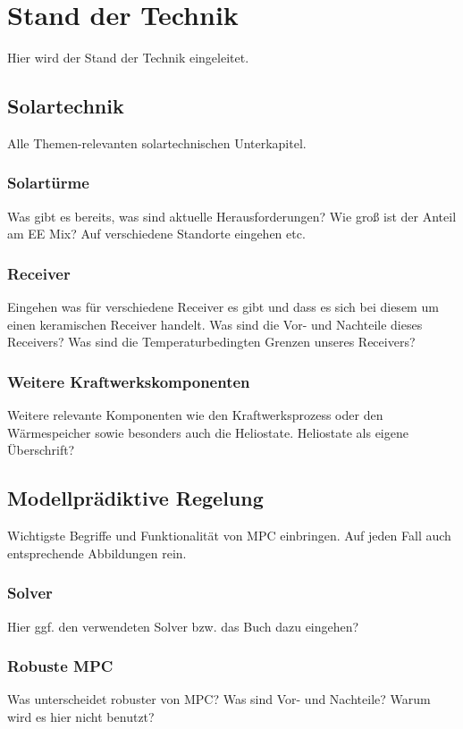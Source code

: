 \chapter{Stand der Technik} \label{ch_StandTechnik}
Hier wird der Stand der Technik eingeleitet.

\section{Solartechnik} \label{sec_Solartechnik}
Alle Themen-relevanten solartechnischen Unterkapitel.

\subsection{Solartürme} \label{subsec_Solartürme}
Was gibt es bereits, was sind aktuelle Herausforderungen?
Wie groß ist der Anteil am EE Mix?
Auf verschiedene Standorte eingehen etc.

\subsection{Receiver} \label{subsec_Receiver}
Eingehen was für verschiedene Receiver es gibt und dass es sich bei diesem um einen keramischen Receiver handelt.
Was sind die Vor- und Nachteile dieses Receivers?
Was sind die Temperaturbedingten Grenzen unseres Receivers?

\subsection{Weitere Kraftwerkskomponenten} \label{subsec_WeitereKomponenten}
Weitere relevante Komponenten wie den Kraftwerksprozess oder den Wärmespeicher sowie besonders auch die Heliostate.
Heliostate als eigene Überschrift?

\section{Modellprädiktive Regelung} \label{sec_ModellprädiktiveRegelung}
Wichtigste Begriffe und Funktionalität von MPC einbringen.
Auf jeden Fall auch entsprechende Abbildungen rein.

\subsection{Solver} \label{subsec_Solver}
Hier ggf. den verwendeten Solver bzw. das Buch dazu eingehen? \cite{Follinger.2016}

\subsection{Robuste MPC} \label{subsec_RobusteMPC}
Was unterscheidet robuster von  MPC? Was sind Vor- und Nachteile?
Warum wird es hier nicht benutzt?

